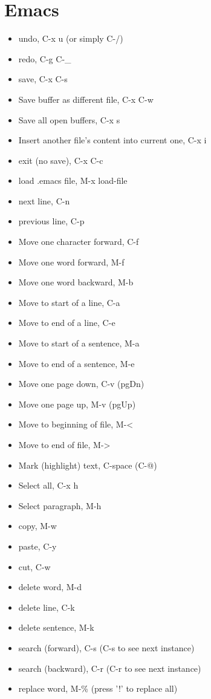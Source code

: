 \documentclass[11pt]{article}
\begin{document}
\section{Emacs}
\label{sec:org97e12f0}
\begin{itemize}
\item undo, C-x u (or simply C-/)
\item redo, C-g C-\_
\item save, C-x C-s
\item Save buffer as different file, C-x C-w
\item Save all open buffers, C-x s
\item Insert another file's content into current one, C-x i
\item exit (no save), C-x C-c
\item load .emacs file, M-x load-file
\item next line, C-n
\item previous line, C-p
\item Move one character forward, C-f
\item Move one word forward, M-f
\item Move one word backward, M-b
\item Move to start of a line, C-a
\item Move to end of a line, C-e
\item Move to start of a sentence, M-a
\item Move to end of a sentence, M-e
\item Move one page down, C-v (pgDn)
\item Move one page up, M-v (pgUp)
\item Move to beginning of file, M-<
\item Move to end of file, M->
\item Mark (highlight) text, C-space (C-@)
\item Select all, C-x h
\item Select paragraph, M-h
\item copy, M-w
\item paste, C-y
\item cut, C-w
\item delete word, M-d
\item delete line, C-k
\item delete sentence, M-k
\item search (forward), C-s (C-s to see next instance)
\item search (backward), C-r (C-r to see next instance)
\item replace word, M-\% (press '!' to replace all)

\end{itemize}
\end{document}

